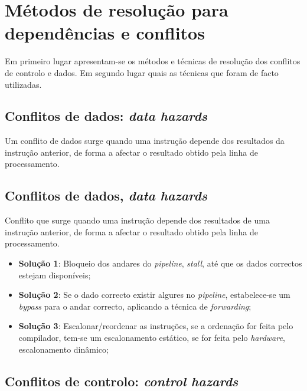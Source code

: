 \documentclass[11pt]{article}
\numberwithin{equation}{section}
\begin{document}
\section{Métodos de resolução para dependências e conflitos}

Em primeiro lugar apresentam-se os métodos e técnicas de resolução dos conflitos de controlo e dados. Em segundo lugar quais as técnicas que foram de facto utilizadas.

\subsection{Conflitos de dados: \textit{data hazards}}



Um conflito de dados surge quando uma instrução depende dos	resultados da instrução anterior, de forma a afectar o resultado obtido pela linha de processamento.

\subsection{Conflitos de dados, \textit{data hazards}}

Conflito que surge quando uma instrução depende dos	resultados de uma instrução anterior, de forma a afectar o resultado obtido pela linha de processamento.

\begin{itemize}
	\item \textbf{Solução 1}: Bloqueio dos andares do \textit{pipeline}, \textit{stall}, até que os dados correctos estejam disponíveis;
	\item \textbf{Solução 2}: Se o dado correcto existir algures no \textit{pipeline}, estabelece-se um \textit{bypass} para o andar correcto, aplicando a técnica de \textit{forwarding};
	\vspace{-2.5mm}
	\item \textbf{Solução 3}: Escalonar/reordenar as instruções, se a ordenação for feita pelo compilador, tem-se um escalonamento estático, se for feita pelo \textit{hardware}, escalonamento dinâmico;
\end{itemize}

\subsection{Conflitos de controlo: \textit{control hazards}}
\end{document}

